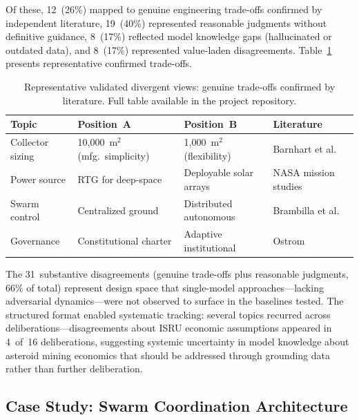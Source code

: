 \documentclass[11pt,a4paper]{article}
\begin{document}
Of these, 12~(26\%) mapped to genuine engineering trade-offs confirmed by independent literature, 19~(40\%) represented reasonable judgments without definitive guidance, 8~(17\%) reflected model knowledge gaps (hallucinated or outdated data), and 8~(17\%) represented value-laden disagreements. Table~\ref{tab:validated_divergent} presents representative confirmed trade-offs.

\begin{table}[ht]
\centering
\caption{Representative validated divergent views: genuine trade-offs confirmed by literature. Full table available in the project repository.}
\label{tab:validated_divergent}
\begin{tabular}{@{}p{2.2cm}p{3.2cm}p{3.2cm}p{4cm}@{}}
\toprule
\textbf{Topic} & \textbf{Position~A} & \textbf{Position~B} & \textbf{Literature} \\
\midrule
Collector sizing & 10{,}000~m$^2$ (mfg.\ simplicity) & 1{,}000~m$^2$ (flexibility) & Barnhart et al.~\cite{barnhart2007smallsat} \\
Power source & RTG for deep-space & Deployable solar arrays & NASA mission studies~\cite{nasa2020se} \\
Swarm control & Centralized ground & Distributed autonomous & Brambilla et al.~\cite{brambilla2013swarm} \\
Governance & Constitutional charter & Adaptive institutional & Ostrom~\cite{ostrom1990governing} \\
\bottomrule
\end{tabular}
\end{table}

The 31~substantive disagreements (genuine trade-offs plus reasonable judgments, 66\% of total) represent design space that single-model approaches---lacking adversarial dynamics---were not observed to surface in the baselines tested. The structured format enabled systematic tracking: several topics recurred across deliberations---disagreements about ISRU economic assumptions appeared in 4~of~16 deliberations, suggesting systemic uncertainty in model knowledge about asteroid mining economics that should be addressed through grounding data rather than further deliberation.

\subsection{Case Study: Swarm Coordination Architecture}
\end{document}
